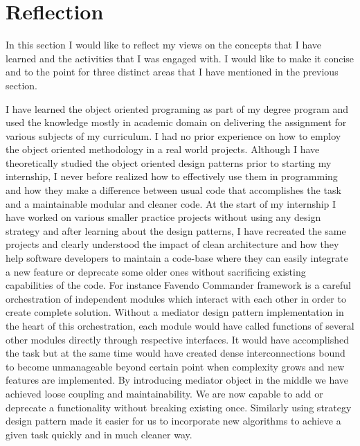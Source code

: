 \section{Reflection}
In this section I would like to reflect my views on the concepts that I have learned and the activities that I was engaged with. I would like to make it concise and to the point for three distinct areas that I have mentioned in the previous section.

\par I have learned the object oriented programing as part of my degree program and used the knowledge mostly in academic domain on delivering the assignment for various subjects of my curriculum. I had no prior experience on how to employ the object oriented methodology in a real world projects. Although I have theoretically studied the object oriented design patterns prior to starting my internship, I never before realized how to effectively use them in programming and how they make a difference between usual code that accomplishes the task and a maintainable modular and cleaner code. At the start of my internship I have worked on various smaller practice projects without using any design strategy and after learning about the design patterns, I have recreated the same projects and clearly understood the impact of clean architecture and how they help software developers to maintain a code-base where they can easily integrate a new feature or deprecate some older ones without sacrificing existing capabilities of the code. For instance Favendo Commander framework is a careful orchestration of independent modules which interact with each other in order to create complete solution. Without a mediator design pattern implementation in the heart of this orchestration,  each module would have called functions of several other modules directly through respective interfaces. It would have accomplished the task but at the same time would have created dense interconnections bound to become unmanageable beyond certain point when complexity grows and new features are implemented. By introducing mediator object in the middle we have achieved loose coupling and maintainability. We are now capable to add or deprecate a functionality without breaking existing once. Similarly using strategy design pattern made it easier for us to incorporate new algorithms to achieve a given task quickly and in much cleaner way.

